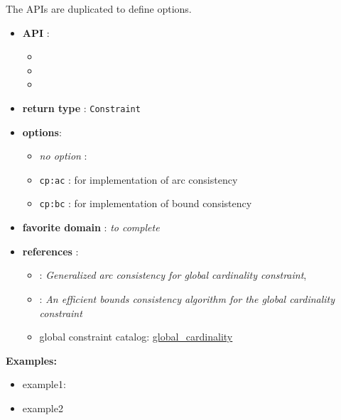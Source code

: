 The APIs are duplicated to define options. 

\begin{itemize}
	\item \textbf{API} :
      \begin{itemize}
	\item {}
	\item {}
	\item {}
      \end{itemize}
	\item \textbf{return type} : \texttt{Constraint}
	\item \textbf{options}:
	\begin{itemize}
		\item \emph{no option} :
		\item \texttt{cp:ac} : for \cite{ReginAAAI96} implementation of arc consistency
		\item \texttt{cp:bc} : for  \cite{QuimperCP03} implementation of bound consistency
	\end{itemize}
	\item \textbf{favorite domain} : \emph{to complete}
	\item \textbf{references} :
      \begin{itemize}
      \item \cite{ReginAAAI96}: \emph{Generalized arc consistency for global cardinality constraint},
      \item \cite{QuimperCP03}: \emph{An efficient bounds consistency algorithm for the global cardinality constraint}
      \item global constraint catalog: \href{http://www.emn.fr/x-info/sdemasse/gccat/Cglobal_cardinality.html}{global\_cardinality}
      \end{itemize}
\end{itemize}

\textbf{Examples:}
\begin{itemize}
	\item example1:
\end{itemize}



\begin{itemize}
	\item example2
\end{itemize}


